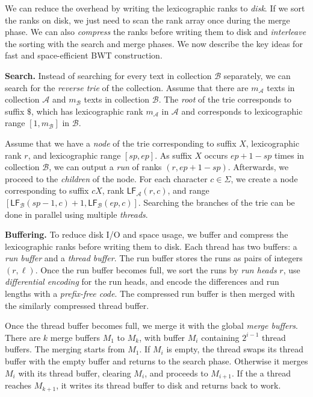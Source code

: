 \documentclass[smallabstract,smallcaptions]{dccpaper}
\newcommand{\BWT}{\textsf{BWT}}
\newcommand{\mLF}{\ensuremath{\mathsf{LF}}}
\newcommand{\Acoll}{\ensuremath{\mathcal{A}}}
\newcommand{\Bcoll}{\ensuremath{\mathcal{B}}}
\begin{document}
We can reduce the overhead by writing the lexicographic ranks to \emph{disk}. If we sort the ranks on disk, we just need to scan the rank array once during the merge phase. We can also \emph{compress} the ranks before writing them to disk and \emph{interleave} the sorting with the search and merge phases. We now describe the key ideas for fast and space-efficient \BWT{} construction.

\smallbreak\noindent\textbf{Search.} Instead of searching for every text in collection $\Bcoll$ separately, we can search for the \emph{reverse trie} of the collection. Assume that there are $m_{\Acoll}$ texts in collection $\Acoll$ and $m_{\Bcoll}$ texts in collection $\Bcoll$. The \emph{root} of the trie corresponds to suffix $\$$, which has lexicographic rank $m_{\Acoll}$ in $\Acoll$ and corresponds to lexicographic range $[1,m_{\Bcoll}]$ in $\Bcoll$.

Assume that we have a \emph{node} of the trie corresponding to suffix $X$, lexicographic rank $r$, and lexicographic range $[sp,ep]$. As suffix $X$ occurs $ep+1-sp$ times in collection $\Bcoll$, we can output a \emph{run} of ranks $(r, ep+1-sp)$. Afterwards, we proceed to the \emph{children} of the node. For each character $c \in \Sigma$, we create a node corresponding to suffix $cX$, rank $\mLF_{\Acoll}(r,c)$, and range $[\mLF_{\Bcoll}(sp-1, c) + 1, \mLF_{\Bcoll}(ep, c)]$. Searching the branches of the trie can be done in parallel using multiple \emph{threads}.

\smallbreak\noindent\textbf{Buffering.} To reduce disk I/O and space usage, we buffer and compress the lexicographic ranks before writing them to disk. Each thread has two buffers: a \emph{run buffer} and a \emph{thread buffer}. The run buffer stores the runs as pairs of integers $(r, \ell)$. Once the run buffer becomes full, we sort the runs by \emph{run heads} $r$, use \emph{differential encoding} for the run heads, and encode the differences and run lengths with a \emph{prefix-free code}. The compressed run buffer is then merged with the similarly compressed thread buffer.

Once the thread buffer becomes full, we merge it with the global \emph{merge buffers}. There are $k$ merge buffers $M_{1}$ to $M_{k}$, with buffer $M_{i}$ containing $2^{i-1}$ thread buffers. The merging starts from $M_{1}$. If $M_{i}$ is empty, the thread swaps its thread buffer with the empty buffer and returns to the search phase. Otherwise it merges $M_{i}$ with its thread buffer, clearing $M_{i}$, and proceeds to $M_{i+1}$. If the a thread reaches $M_{k+1}$, it writes its thread buffer to disk and returns back to work.
\end{document}
